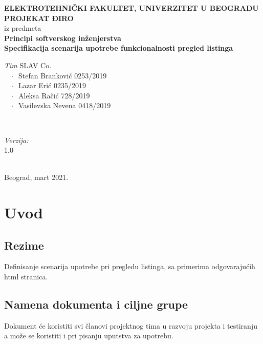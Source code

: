 \documentclass[12pt]{article}
\begin{document}
    \renewcommand{\labelenumii}{\arabic{enumi}.\arabic{enumii}}
	\begin{titlepage}  
		\center
		\textbf{ \LARGE ELEKTROTEHNIČKI FAKULTET, UNIVERZITET U BEOGRADU } \\[4cm]
		\textbf{ \Large PROJEKAT ĐIRO\texttrademark} \\[0.3cm]
		iz predmeta \\[0.3cm]
		\textbf{ \Large Principi softverskog inženjerstva} \\[0.7cm]
		{ \huge \bfseries Specifikacija scenarija upotrebe funkcionalnosti pregled listinga } \\[6cm]
		

		\begin{minipage}{0.5\textwidth}
			\begin{flushleft}
				\large
				\emph{Tim} SLAV Co. \\
			     $\;\;\; \cdot \;\;$Stefan Branković  0253/2019\\
			     $\;\;\; \cdot \;\;$Lazar Erić 0235/2019\\
			     $\;\;\; \cdot \;\;$Aleksa Račić 728/2019\\
			     $\;\;\; \cdot \;\;$Vasilevska Nevena 0418/2019
			\end{flushleft}
		\end{minipage}
		~
		\begin{minipage}{0.4\textwidth}
			\begin{flushright}
				\large
				\emph{Verzija:} \\
				1.0
			\end{flushright}
		\end{minipage} \\[2cm]
		\enlargethispage{4\baselineskip}
		{ \large Beograd, mart 2021. }
		\vfill
	\end{titlepage}
\pagebreak
\tableofcontents
\pagebreak



\section{Uvod}
\subsection{Rezime}
Definisanje scenarija upotrebe pri pregledu listinga, sa primerima odgovarajućih html stranica.
\subsection{Namena dokumenta i ciljne grupe}
Dokument će koristiti svi članovi projektnog tima u razvoju projekta i testiranju a može se koristiti i pri pisanju uputstva za
upotrebu.
\end{document}
